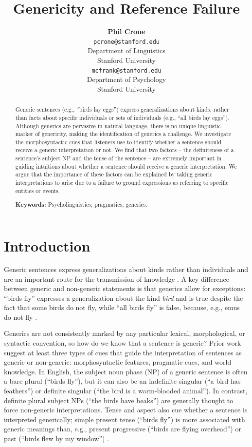 \documentclass[10pt,letterpaper]{article}
\title{Genericity and Reference Failure}
\author{{\large \bf Phil Crone} \\
	\texttt{pcrone@stanford.edu}\\
  Department of Linguistics \\
  Stanford University
  \And {\large \bf Michael C. Frank} \\
  \texttt{mcfrank@stanford.edu}\\
  Department of Psychology \\
  Stanford University}
\begin{document}
\maketitle

\begin{abstract}
Generic sentences (e.g., ``birds lay eggs'') express generalizations about kinds, rather than facts about specific individuals or sets of individuals (e.g., ``all birds lay eggs''). Although generics are pervasive in natural language, there is no unique linguistic marker of genericity, making the identification of generics a challenge. We investigate the morphosyntactic cues that listeners use to identify whether a sentence should receive a generic interpretation or not. We find that two factors -- the definiteness of a sentence's subject NP and the tense of the sentence -- are extremely important in guiding intuitions about whether a sentence should receive a generic interpretation. We argue that the importance of these factors can be explained by taking generic interpretations to arise due to a failure to ground expressions as referring to specific entities or events. 

\textbf{Keywords:} Psycholinguistics; pragmatics; generics.
\end{abstract}


\section{Introduction}
 
Generic sentences express generalizations about kinds rather than individuals and are an important route for the transmission of knowledge \cite{gelman2003}. A key difference between generic and non-generic statements is that generics allow for exceptions: ``birds fly'' expresses a generalization about the kind \textit{bird} and is true despite the fact that some birds do not fly, while ``all birds fly'' is false, because, e.g., emus do not fly \cite{Prasada:2000}. 

Generics are not consistently marked by any particular lexical, morphological, or syntactic convention, so how do we know that a sentence is generic? Prior work suggest at least three types of cues that guide the interpretation of sentences as generic or non-generic: morphosyntactic features, pragmatic cues, and world knowledge. In English, the subject noun phase (NP) of a generic sentence is often a bare plural (``birds fly''), but it can also be an indefinite singular (``a bird has feathers'') or definite singular (``the bird is a warm-blooded animal''). In contrast, definite plural subject NPs (``the birds have beaks'') are generally thought to force non-generic interpretations. Tense and aspect also cue whether a sentence is interpreted generically; simple present tense (``birds fly'') is more associated with generic meanings than, e.g., present progressive (``birds are flying overhead'') or past (``birds flew by my window'') \cite{Carlson:1977,Krifka:1995,Lyons:1977}. 
\end{document}
